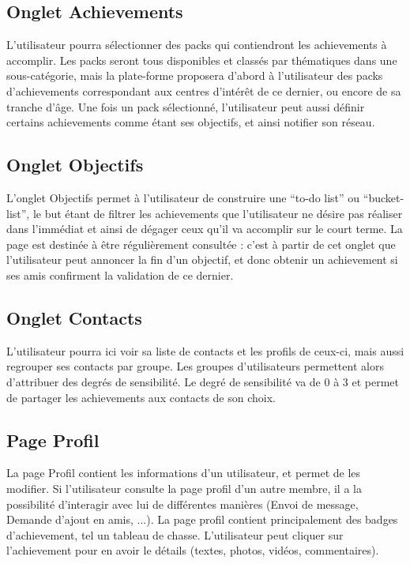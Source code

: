 \documentclass{life-fr}
\begin{document}
\subsection{Onglet Achievements}

L'utilisateur pourra sélectionner des packs qui contiendront les achievements à accomplir. Les packs seront tous disponibles et classés par thématiques dans une sous-catégorie, mais la plate-forme proposera d'abord à l'utilisateur des packs d'achievements correspondant aux centres d'intérêt de ce dernier, ou encore de sa tranche d'âge. Une fois un pack sélectionné, l'utilisateur peut aussi définir certains achievements comme étant ses objectifs, et ainsi notifier son réseau.

\subsection{Onglet Objectifs}

L'onglet Objectifs permet à l'utilisateur de construire une “to-do list” ou “bucket-list”, le but étant de filtrer les achievements que l'utilisateur ne désire pas réaliser dans l'immédiat et ainsi de dégager ceux qu'il va accomplir sur le court terme. La page est destinée à être régulièrement consultée : c'est à partir de cet onglet que l'utilisateur peut annoncer la fin d'un objectif, et donc obtenir un achievement si ses amis confirment la validation de ce dernier.

\subsection{Onglet Contacts}

L'utilisateur pourra ici voir sa liste de contacts et les profils de ceux-ci, mais aussi regrouper ses contacts par groupe. Les groupes d'utilisateurs permettent alors d'attribuer des degrés de sensibilité.
Le degré de sensibilité va de 0 à 3 et permet de partager les achievements aux contacts de son choix.

\subsection{Page Profil}
La page Profil contient les informations d'un utilisateur, et permet de les modifier. Si l'utilisateur consulte la page profil d'un autre membre, il a la possibilité d'interagir avec lui de différentes manières (Envoi de message, Demande d'ajout en amis, ...).
La page profil contient principalement des badges d'achievement, tel un tableau de chasse. L'utilisateur peut cliquer sur l'achievement pour en avoir le détails (textes, photos, vidéos, commentaires).
\end{document}
